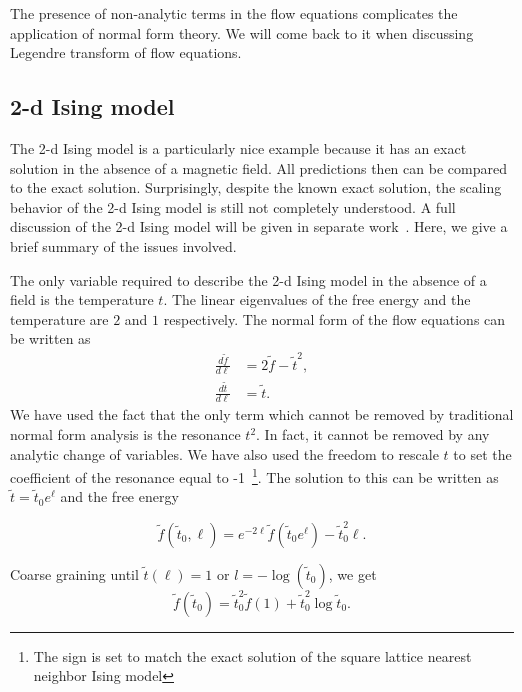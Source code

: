 \documentclass[
 reprint,
 amsmath,amssymb,
 aps, superscriptaddress, pre
]{revtex4-1}
\begin{document}
The presence of non-analytic terms in the flow equations complicates the application of normal form theory. We will come back to it when discussing Legendre transform of flow equations.


\subsection{2-d Ising model} \label{sec:2dising}
The 2-d Ising model is a particularly nice example because it has an exact solution in the absence of a magnetic field. All predictions then can be compared to the exact solution. Surprisingly, despite the known exact solution, the scaling behavior of the 2-d Ising model is still not completely understood. A full discussion of the 2-d Ising model will be given in separate work~\cite{Clement18}. Here, we give a brief summary of the issues involved.

The only variable required to describe the 2-d Ising model in the absence of a field is the temperature $t$. The linear eigenvalues of the free energy and the temperature are $2$ and $1$ respectively. The normal form of the flow equations can be written as 
\begin{align}
 \frac{d \tilde f}{d \ell} &= 2  \tilde f - \tilde t^2 , \\
 \frac{d \tilde t}{d \ell} &=  \tilde t .
\end{align}
We have used the fact that the only term which cannot be removed by traditional normal form analysis is the resonance $t^2$. In fact, it cannot be removed by any analytic change of variables. We have also used the freedom to rescale $t$ to set the coefficient of the resonance equal to -1~\footnote{The sign is set to match the exact solution of the square lattice nearest neighbor Ising model}. The solution to this can be written as $\tilde t = \tilde t_0 e^{\ell}$ and the free energy 

\begin{equation}
\label{2disingeq}
 \tilde f(\tilde t_0, \ell) = e^{-2 \ell} \tilde f(\tilde t_0 e^{\ell}) - \tilde t_0^2 \ell .
\end{equation}

Coarse graining until $\tilde t(\ell) = 1$ or $l = -\log(\tilde t_0)$, we get
\begin{equation}
 \tilde f(\tilde t_0) = \tilde t_0^2 \tilde f(1) + \tilde t_0^2 \log \tilde t_0 .
\end{equation}
\end{document}
